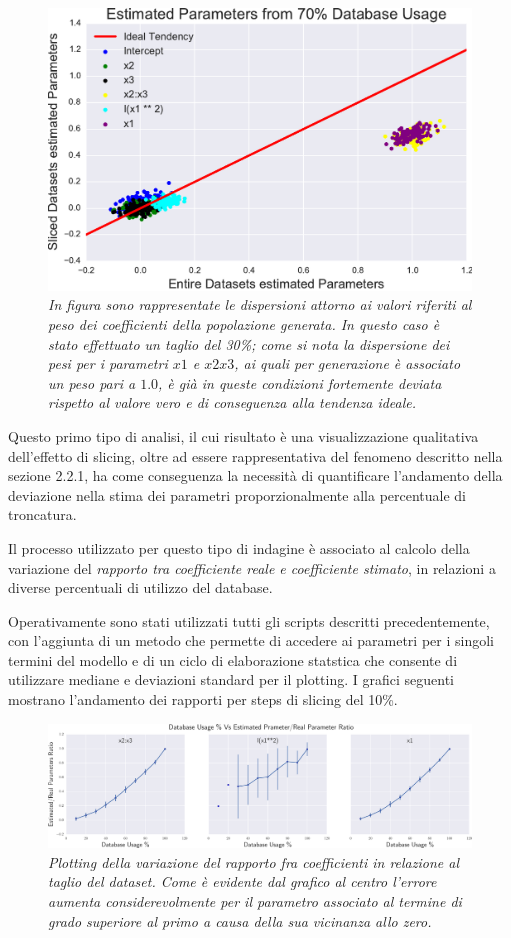 \documentclass[12pt,openright,twoside,a4paper]{book}
\begin{document}
\begin{figure}[!h]
\centering
\includegraphics[width=0.55\linewidth]{coeffscatter70}
\caption{\textit{In figura sono rappresentate le dispersioni attorno ai valori riferiti al peso dei coefficienti della popolazione generata.
In questo caso è stato effettuato un taglio del 30\%; come si nota la dispersione dei pesi per i parametri $x1$ e $x2x3$, ai quali per generazione è associato un peso pari a $1.0$, è già in queste condizioni fortemente deviata rispetto al valore vero e di conseguenza alla tendenza ideale.}}
\label{coeffscatter70}
\end{figure}

Questo primo tipo di analisi, il cui risultato è una visualizzazione qualitativa dell'effetto di slicing, oltre ad essere rappresentativa del fenomeno descritto nella sezione 2.2.1, ha come conseguenza la necessità di quantificare l'andamento della deviazione nella stima dei parametri proporzionalmente alla percentuale di troncatura.

Il processo utilizzato per  questo tipo di indagine è associato al calcolo della variazione del \textit{rapporto tra coefficiente reale e coefficiente stimato}, in relazioni a diverse percentuali di utilizzo del database.

Operativamente sono stati utilizzati tutti gli scripts descritti precedentemente, con l'aggiunta di un metodo che permette di accedere ai parametri per i singoli termini del modello e di un ciclo di elaborazione statstica che consente  di utilizzare mediane e deviazioni standard per il plotting.
I grafici seguenti mostrano l'andamento dei rapporti per steps di slicing del 10\%.

\begin{figure}[!h]
\centering
\includegraphics[width=1.0\linewidth]{finalgraph}
\caption{\textit{Plotting della variazione del rapporto fra coefficienti in relazione al taglio del dataset. Come è evidente dal grafico al centro l'errore aumenta considerevolmente per il parametro associato al termine di grado superiore al primo a causa della sua vicinanza allo zero.}}
\label{finalgraph}
\end{figure}
\end{document}
